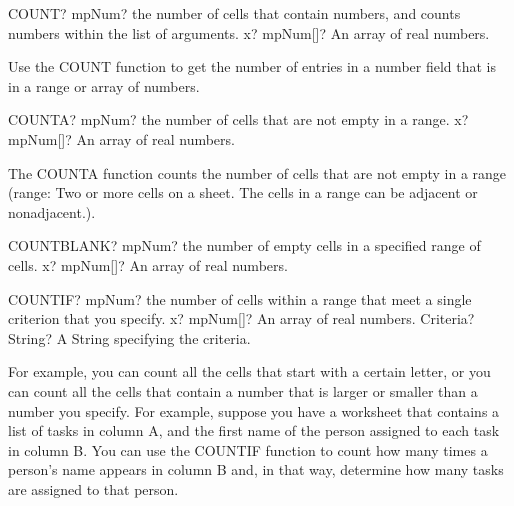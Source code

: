 \begin{mpFunctionsExtract}
	\mpWorksheetFunctionOneNotImplemented
	{COUNT? mpNum? the number of cells that contain numbers, and counts numbers within the list of arguments.}
	{x? mpNum[]? An array of real numbers.}
\end{mpFunctionsExtract}

\vspace{0.3cm}
Use the \textsf{COUNT} function to get the number of entries in a number field that is in a range or array of numbers.


\vspace{0.6cm}
\begin{mpFunctionsExtract}
	\mpWorksheetFunctionOneNotImplemented
	{COUNTA? mpNum? the number of cells that are not empty in a range.}
	{x? mpNum[]? An array of real numbers.}
\end{mpFunctionsExtract}

\vspace{0.3cm}
The \textsf{COUNTA} function counts the number of cells that are not empty in a range (range: Two or more cells on a sheet. The cells in a range can be adjacent or nonadjacent.).


\vspace{0.6cm}
\begin{mpFunctionsExtract}
	\mpWorksheetFunctionOneNotImplemented
	{COUNTBLANK? mpNum? the number of empty cells in a specified range of cells.}
	{x? mpNum[]? An array of real numbers.}
\end{mpFunctionsExtract}



\vspace{0.6cm}
\begin{mpFunctionsExtract}
	\mpWorksheetFunctionTwoNotImplemented
	{COUNTIF? mpNum? the number of cells within a range that meet a single criterion that you specify.}
	{x? mpNum[]? An array of real numbers.}
	{Criteria? String? A String specifying the criteria.}
\end{mpFunctionsExtract}

\vspace{0.3cm}
For example, you can count all the cells that start with a certain letter, or you can count all the cells that contain a number that is larger or smaller than a number you specify. For example, suppose you have a worksheet that contains a list of tasks in column A, and the first name of the person assigned to each task in column B. You can use the \textsf{COUNTIF} function to count how many times a person's name appears in column B and, in that way, determine how many tasks are assigned to that person.



